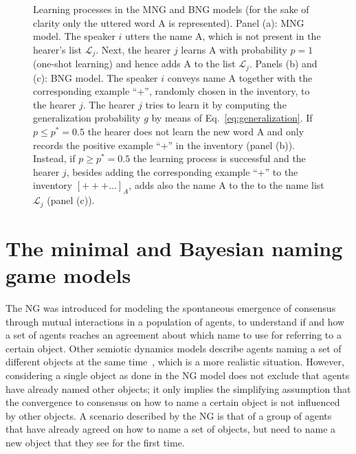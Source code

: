\documentclass[review]{elsarticle}
\newcommand{\+}{\! + \!}
\renewcommand{\L}{{\mathcal{L}}}
\begin{document}
\begin{figure}[ht!]
    \caption{Learning processes in the MNG and BNG models (for the sake of clarity only the uttered word A is represented).
        Panel (a): MNG model. 
        The speaker $i$ utters the name A, which is not present in the hearer's list $\L_j$. 
        Next, the hearer $j$ learns A with probability $p=1$ (one-shot learning) and hence adds A to the list $\L_j$.
        Panels (b) and (c): BNG model.  
        The speaker $i$ conveys name A together with the corresponding example ``+'', randomly chosen in the inventory, to the hearer $j$. 
        The hearer $j$  tries to learn it by computing the generalization probability $g$ by means of Eq.~\eqref{eq:generalization}. 
        If $p \le p^* = 0.5$ the hearer does not learn the new word A and only records the positive example ``+'' in the inventory (panel (b)). 
        Instead, if  $p \ge p^* = 0.5$ the learning process is successful and the hearer $j$, besides adding the corresponding example ``+'' to the inventory $[+++\dots]_A$, adds also the name A to the to the name list $\L_j$ (panel (c)).}
    \label{fig:rules}
\end{figure}



\section{The minimal and Bayesian naming game models} 
\label{sec:NGBNG}

The NG was introduced for modeling the spontaneous emergence of consensus through mutual interactions in a population of agents, to understand if and how a set of agents reaches an agreement about which name to use for referring to a certain object.
Other semiotic dynamics models describe agents naming a set of different objects at the same time~\cite{Hurford-1989a,Nowak-1999a}, which is a more realistic situation.
However, considering a single object as done in the NG model does not exclude that agents have already named other objects; it only implies the simplifying assumption that the convergence to consensus on how to name a certain object is not influenced by other objects.
A scenario described by the NG is that of a group of agents that have already agreed on how to name a set of objects, but need to name a new object that they see for the first time.
\end{document}
